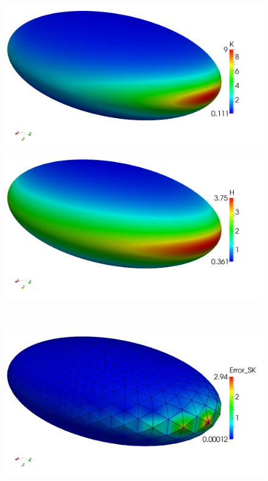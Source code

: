   \begin{figure}
    \begin{minipage}[t]{0.49\textwidth}
       \centering\includegraphics[width=\textwidth]{bilder/Curvature/heineC/K2k.png}
    \end{minipage}\hfill
    \begin{minipage}[t]{0.49\textwidth}
       \centering\includegraphics[width=\textwidth]{bilder/Curvature/heineC/H2k.png}
    \end{minipage}\\
    \begin{minipage}[t]{0.49\textwidth}
       \centering\includegraphics[width=\textwidth]{bilder/Curvature/heineC/SK2k.png}

\end{minipage}
\end{figure}
